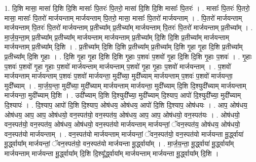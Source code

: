 \documentclass[17pt]{extarticle}
\begin{document}
1. दि॒शि मासा॒ मासा॑ दि॒शि दि॒शि मासाः᳚ पि॒तरः॑ पि॒तरो॒ मासा॑ दि॒शि दि॒शि मासाः᳚ पि॒तरः॑ । . मासाः᳚ पि॒तरः॑ पि॒तरो॒ मासा॒ मासाः᳚ पि॒तरो॑ मार्जयन्ताम् मार्जयन्ताम् पि॒तरो॒ मासा॒ मासाः᳚ पि॒तरो॑ मार्जयन्ताम् । . पि॒तरो॑ मार्जयन्ताम् मार्जयन्ताम् पि॒तरः॑ पि॒तरो॑ मार्जयन्ताम् प्र॒तीच्या᳚म् प्र॒तीच्या᳚म् मार्जयन्ताम् पि॒तरः॑ पि॒तरो॑ मार्जयन्ताम् प्र॒तीच्या᳚म् । . मा॒र्ज॒य॒न्ता॒म् प्र॒तीच्या᳚म् प्र॒तीच्या᳚म् मार्जयन्ताम् मार्जयन्ताम् प्र॒तीच्या᳚म् दि॒शि दि॒शि प्र॒तीच्या᳚म् मार्जयन्ताम् मार्जयन्ताम् प्र॒तीच्या᳚म् दि॒शि । . प्र॒तीच्या᳚म् दि॒शि दि॒शि प्र॒तीच्या᳚म् प्र॒तीच्या᳚म् दि॒शि गृ॒हा गृ॒हा दि॒शि प्र॒तीच्या᳚म् प्र॒तीच्या᳚म् दि॒शि गृ॒हाः । . दि॒शि गृ॒हा गृ॒हा दि॒शि दि॒शि गृ॒हाः प॒शवः॑ प॒शवो॑ गृ॒हा दि॒शि दि॒शि गृ॒हाः प॒शवः॑ । . गृ॒हाः प॒शवः॑ प॒शवो॑ गृ॒हा गृ॒हाः प॒शवो॑ मार्जयन्ताम् मार्जयन्ताम् प॒शवो॑ गृ॒हा गृ॒हाः प॒शवो॑ मार्जयन्ताम् । . प॒शवो॑ मार्जयन्ताम् मार्जयन्ताम् प॒शवः॑ प॒शवो॑ मार्जयन्ता॒ मुदी᳚च्या॒ मुदी᳚च्याम् मार्जयन्ताम् प॒शवः॑ प॒शवो॑ मार्जयन्ता॒ मुदी᳚च्याम् । . मा॒र्ज॒य॒न्ता॒ मुदी᳚च्या॒ मुदी᳚च्याम् मार्जयन्ताम् मार्जयन्ता॒ मुदी᳚च्याम् दि॒शि दि॒श्युदी᳚च्याम् मार्जयन्ताम् मार्जयन्ता॒ मुदी᳚च्याम् दि॒शि । . उदी᳚च्याम् दि॒शि दि॒श्युदी᳚च्या॒ मुदी᳚च्याम् दि॒श्याप॒ आपो॑ दि॒श्युदी᳚च्या॒ मुदी᳚च्याम् दि॒श्यापः॑ । . दि॒श्याप॒ आपो॑ दि॒शि दि॒श्याप॒ ओष॑धय॒ ओष॑धय॒ आपो॑ दि॒शि दि॒श्याप॒ ओष॑धयः । . आप॒ ओष॑धय॒ ओष॑धय॒ आप॒ आप॒ ओष॑धयो॒ वन॒स्पत॑यो॒ वन॒स्पत॑य॒ ओष॑धय॒ आप॒ आप॒ ओष॑धयो॒ वन॒स्पत॑यः । . ओष॑धयो॒ वन॒स्पत॑यो॒ वन॒स्पत॑य॒ ओष॑धय॒ ओष॑धयो॒ वन॒स्पत॑यो मार्जयन्ताम् मार्जयन्तां॒ ॅवन॒स्पत॑य॒ ओष॑धय॒ ओष॑धयो॒ वन॒स्पत॑यो मार्जयन्ताम् । . वन॒स्पत॑यो मार्जयन्ताम् मार्जयन्तां॒ ॅवन॒स्पत॑यो॒ वन॒स्पत॑यो मार्जयन्ता मू॒र्द्ध्वाया॑ मू॒र्द्ध्वाया᳚म् मार्जयन्तां॒ ॅवन॒स्पत॑यो॒ वन॒स्पत॑यो मार्जयन्ता मू॒र्द्ध्वाया᳚म् । . मा॒र्ज॒य॒न्ता॒ मू॒र्द्ध्वाया॑ मू॒र्द्ध्वाया᳚म् मार्जयन्ताम् मार्जयन्ता मू॒र्द्ध्वाया᳚म् दि॒शि दि॒श्यू᳚र्द्ध्वाया᳚म् मार्जयन्ताम् मार्जयन्ता मू॒र्द्ध्वाया᳚म् दि॒शि । \newline
\end{document}
